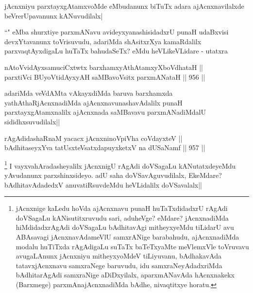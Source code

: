 \begin{artha}
jAcnxniyu parxtayxgAtamxvoMde eMbudanunx biTuTx adara ajAcnxnavilalxde beVrerUpavanunx kANuvudilalx|  
\end{artha}

\begin{artha}
``\stext" eMba shurxtiye parxmANavu avideyxyanashisidadxrU punaH udaBxvisi devxYtavanunx toVrisuvudu, adariMda shAsitxrXya kamaRdalilx parxvaqtAyxdigaLu huTaTx bahudaSeTx? eMdu heVLikeVLidare - utatxra
\end{artha}

\begin{shl}
nAtoV\s vidAyxsamuciCxtwtx barxhamxyAthAtamxyXboVdhataH || \\
parxtiVci BUyoV\s tidAyxyAH saMBavoV\s sitx parxmANataH ||  956 ||  
\end{shl}

\begin{artha}
adariMda veVdAMta vAkayxdiMda baruva barxhamxda yathAthaRjAcnxnadiMda ajAcnxnavunashavAdalilx punaH parxtayxgAtamxnalilx ajAcnxnada saMBavavu parxmANadiMdalU sididhxsuvudilalx||
\end{artha}


\begin{shl}
rAgAdidashaRnaM yacacx jAcnxninoV\s piVha coVdayxteV || \\
bAdhitaseyxYva tatUsxteVsatxdapuyxketxV na dUSaNamf ||  957 ||  
\end{shl}

\begin{artha}
\footnote{jAcnxnige kaLedu hoVda ajAcnxnavu punaH huTaTxdidadxrU rAgAdi doVSagaLu kANisutitxruvudu sari, aduheVge? eMdare? jAcnxnadiMda hiMdidadxrAgAdi doVSagaLu bAdhitavAgi mitheyxyeMdu tiLidarU avu ABAsavagi jAcnxnavAdameVlU samxrANige barabahudu, ajAcnxnadiMda modalu huTiTxda rAgAdigaLu suTaTx baTeTxyaMte meVlemxVle toVruvavu avugaLAnunx jAcnxniyu mitheyxyoMdeV tiLiyuvanu, bAdhakavAda tatavxjAcnxnavu samxraNege baruvudu, idu samxraNeyAdadxriMda bAdhitarAgAdi samxraNige aDiDxyilalx, aparxmANavAda hAcnxnakekx (Barxmege) parxmAnajAcnxnadiMda bAdhe, nivaqtitxye horatu.} I vayxvahAradasheyalilx jAcnxnigU rAgAdi doVSagaLu kANutatxdeyeMdu yAvudanunx parxshinxsideyo. adU saha doVSavAguvudilalx, EkeMdare? bAdhitavAdadedxV anuvatiRsuvdeMdu heVLidalilx doVSavalalx||
\end{artha}

